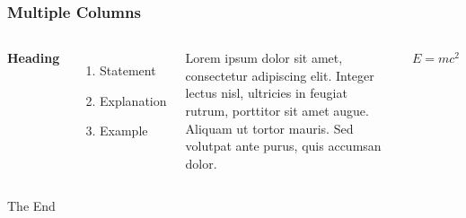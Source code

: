 \documentclass{beamer}
\begin{document}
\begin{frame}
\frametitle{Multiple Columns}
\begin{columns}[c] %

\textbf{Heading}
\begin{enumerate}
\item Statement
\item Explanation
\item Example
\end{enumerate}

Lorem ipsum dolor sit amet, consectetur adipiscing elit. Integer lectus nisl, ultricies in feugiat rutrum, porttitor sit amet augue. Aliquam ut tortor mauris. Sed volutpat ante purus, quis accumsan dolor.
\begin{theorem}
	$E = mc^2$
\end{theorem}
\end{columns}
\end{frame}


\begin{frame}
\Huge{\centerline{The End}}
\end{frame}

\end{document}
